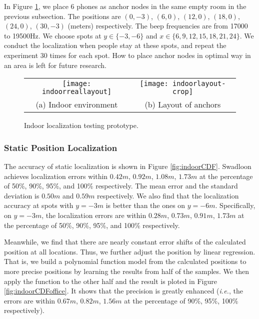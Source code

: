 \documentclass[]{sig-alternate-10pt}
\def\ie{\textit{i.e.}\xspace}
\def \ourprotocol{Swadloon\xspace}
\begin{document}
In Figure \ref{fig:indoorplacement}, we place 6 phones as anchor nodes
in the same empty room in the previous subsection. The positions are
$(0, -3)$, $(6, 0)$, $(12, 0)$, $(18, 0)$, $(24, 0)$, $(30, -3)$
(meters) respectively.  The beep frequencies are from 17000 to
19500Hz. We choose spots at $y\in \{-3, -6\}$ and $x\in
\{6,9,12, 15, 18, 21,24\}$.
We conduct the  localization when people stay at these spots, and
repeat the experiment  30 times for each spot.
How to place anchor nodes in optimal way in an area is left for future
research.
\begin{figure}[htb]
\begin{center}
\begin{tabular}{cc}
\texttt{[image: indoorreallayout]}\quad &
\texttt{[image: indoorlayout-crop]}       \\
(a) Indoor environment & (b) Layout of anchors
\end{tabular}
\end{center}
\caption{Indoor localization testing prototype.}
\label{fig:indoorplacement}
\end{figure}



\subsubsection{Static Position Localization}
\label{subsubsec:localization}

The accuracy of  static  localization is shown in Figure
\ref{fig:indoorCDF}.
\ourprotocol achieves localization errors within $0.42m$,
$0.92m$, $1.08m$, $1.73m$ at the percentage of 50\%, 90\%, 95\%, and 100\%
respectively. The mean error and the standard deviation is $0.50m$ and
$0.59m$ respectively.
We also find that the localization accuracy at spots with $y=-3m$
 is better than the ones on $y=-6m$.
Specifically, on $y=-3m$,
 the localization errors are within $0.28m$, $0.73m$, $0.91m$, $1.73m$ at the
 percentage of 50\%, 90\%, 95\%, and 100\% respectively. 
 
Meanwhile, we find that there are nearly constant error shifts of the
 calculated position at all  locations. 
Thus, we further adjust the position by linear regression. 
That is, we build a polynomial function model from the calculated
 positions to more precise positions by learning the results from half 
 of the samples. 
We then apply the function to the other half and the result is ploted in Figure
\ref{fig:indoorCDFoffice}.
It shows that the 
 precision is greatly enhanced (\ie, the errors are within $0.67m$,
 $0.82m$, $1.56m$ at the 
 percentage of 90\%, 95\%, 100\% respectively). 
 
\end{document}
